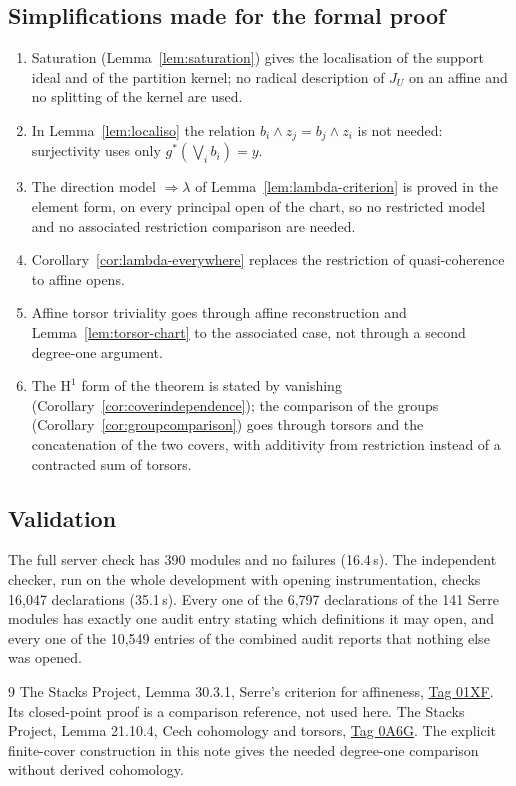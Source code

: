 \documentclass[11pt]{amsart}
\theoremstyle{definition}\newtheorem{definition}[theorem]{Definition}
\theoremstyle{remark}\newtheorem{remark}[theorem]{Remark}
\newcommand{\HH}{\mathrm H}
\begin{document}
\subsection*{Simplifications made for the formal proof}
\begin{enumerate}
\item Saturation (Lemma~\ref{lem:saturation}) gives the localisation of
 the support ideal and of the partition kernel; no radical description
 of $J_U$ on an affine and no splitting of the kernel are used.
\item In Lemma~\ref{lem:localiso} the relation
 $b_i\wedge z_j=b_j\wedge z_i$ is not needed: surjectivity uses only
 $g^*(\bigvee_ib_i)=y$.
\item The direction model $\Rightarrow\lambda$ of
 Lemma~\ref{lem:lambda-criterion} is proved in the element form, on
 every principal open of the chart, so no restricted model and no
 associated restriction comparison are needed.
\item Corollary~\ref{cor:lambda-everywhere} replaces the restriction of
 quasi-coherence to affine opens.
\item Affine torsor triviality goes through affine reconstruction and
 Lemma~\ref{lem:torsor-chart} to the associated case, not through a
 second degree-one argument.
\item The $\HH^1$ form of the theorem is stated by vanishing
 (Corollary~\ref{cor:coverindependence}); the comparison of the groups
 (Corollary~\ref{cor:groupcomparison}) goes through torsors and the
 concatenation of the two covers, with additivity from restriction
 instead of a contracted sum of torsors.
\end{enumerate}

\subsection*{Validation}
The full server check has 390 modules and no failures (16.4\,s). The
independent checker, run on the whole development with opening
instrumentation, checks 16{,}047 declarations (35.1\,s). Every one of
the 6{,}797 declarations of the 141 Serre modules has exactly one audit
entry stating which definitions it may open, and every one of the
10{,}549 entries of the combined audit reports that nothing else was
opened.

\begin{thebibliography}{9}
The Stacks Project, Lemma 30.3.1, Serre's criterion for affineness,
\href{https://stacks.math.columbia.edu/tag/01XF}{Tag 01XF}.
Its closed-point proof is a comparison reference, not used here.
The Stacks Project, Lemma 21.10.4, Cech cohomology and torsors,
\href{https://stacks.math.columbia.edu/tag/0A6G}{Tag 0A6G}.
The explicit finite-cover construction in this note gives the
needed degree-one comparison without derived cohomology.
\end{thebibliography}
\end{document}
